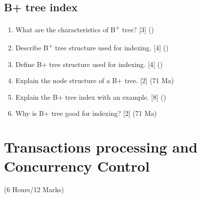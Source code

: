 \documentclass[12pt]{article}
\newcommand{\super}[1]{\textsuperscript{#1}}
\begin{document}
    \subsection{B+ tree index}
    		\begin{enumerate}[noitemsep, topsep=0pt]
    			\item What are the characteristics of B\super{+} tree? \hfill [3] ()
    			
    			\item Describe B\super{+} tree structure used for indexing. \hfill [4] ()
    			
    			\item Define B+ tree structure used for indexing. \hfill [4] ()
    			
    			\item Explain the node structure of a B+ tree. \hfill [2] (71 Ma)
    			
    			\item Explain the B+ tree index with an example. \hfill [8] ()
    			
    			\item Why is B+ tree good for indexing? \hfill [2] (71 Ma)
    		\end{enumerate}

    \pagebreak
\section{Transactions processing and Concurrency Control}
    \begin{center}(6 Hours/12 Marks)\end{center}
\end{document}
